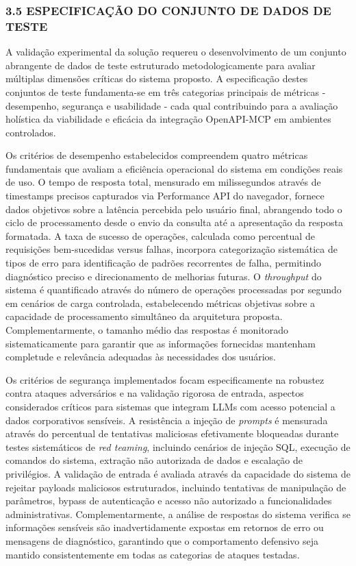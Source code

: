 \documentclass[
]{article}
\begin{document}
\subsubsection{3.5 ESPECIFICAÇÃO DO CONJUNTO DE DADOS DE
TESTE}\label{especificauxe7uxe3o-do-conjunto-de-dados-de-teste}

A validação experimental da solução requereu o desenvolvimento de um
conjunto abrangente de dados de teste estruturado metodologicamente para
avaliar múltiplas dimensões críticas do sistema proposto. A
especificação destes conjuntos de teste fundamenta-se em três categorias
principais de métricas - desempenho, segurança e usabilidade - cada qual
contribuindo para a avaliação holística da viabilidade e eficácia da
integração OpenAPI-MCP em ambientes controlados.

Os critérios de desempenho estabelecidos compreendem quatro métricas
fundamentais que avaliam a eficiência operacional do sistema em
condições reais de uso. O tempo de resposta total, mensurado em
milissegundos através de timestamps precisos capturados via Performance
API do navegador, fornece dados objetivos sobre a latência percebida
pelo usuário final, abrangendo todo o ciclo de processamento desde o
envio da consulta até a apresentação da resposta formatada. A taxa de
sucesso de operações, calculada como percentual de requisições
bem-sucedidas versus falhas, incorpora categorização sistemática de
tipos de erro para identificação de padrões recorrentes de falha,
permitindo diagnóstico preciso e direcionamento de melhorias futuras. O
\emph{throughput} do sistema é quantificado através do número de
operações processadas por segundo em cenários de carga controlada,
estabelecendo métricas objetivas sobre a capacidade de processamento
simultâneo da arquitetura proposta. Complementarmente, o tamanho médio
das respostas é monitorado sistematicamente para garantir que as
informações fornecidas mantenham completude e relevância adequadas às
necessidades dos usuários.

Os critérios de segurança implementados focam especificamente na
robustez contra ataques adversários e na validação rigorosa de entrada,
aspectos considerados críticos para sistemas que integram LLMs com
acesso potencial a dados corporativos sensíveis. A resistência a injeção
de \emph{prompts} é mensurada através do percentual de tentativas
maliciosas efetivamente bloqueadas durante testes sistemáticos de
\emph{red teaming}, incluindo cenários de injeção SQL, execução de
comandos do sistema, extração não autorizada de dados e escalação de
privilégios. A validação de entrada é avaliada através da capacidade do
sistema de rejeitar payloads maliciosos estruturados, incluindo
tentativas de manipulação de parâmetros, bypass de autenticação e acesso
não autorizado a funcionalidades administrativas. Complementarmente, a
análise de respostas do sistema verifica se informações sensíveis são
inadvertidamente expostas em retornos de erro ou mensagens de
diagnóstico, garantindo que o comportamento defensivo seja mantido
consistentemente em todas as categorias de ataques testadas.
\end{document}
